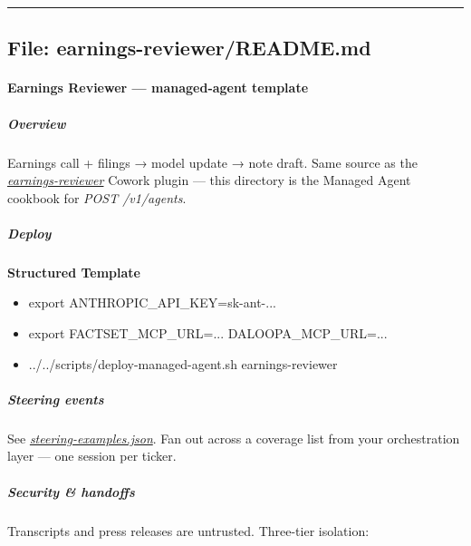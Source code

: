 \documentclass[11pt]{article}
\begin{document}
\vspace{0.8em}\hrule\vspace{0.8em}

\subsection{File: earnings-reviewer/README.md}\label{file:earnings-reviewer-README-md}

\paragraph{Earnings Reviewer — managed-agent template}\mbox{}\par

\subparagraph{Overview}\mbox{}\par

Earnings call + filings → model update → note draft. Same source as the \href{../../plugins/agent-plugins/earnings-reviewer}{\emph{earnings-reviewer}} Cowork plugin — this directory is the Managed Agent cookbook for \emph{POST /v1/agents}.


\subparagraph{Deploy}\mbox{}\par

\textbf{Structured Template}
\begin{itemize}[leftmargin=*,itemsep=2pt,topsep=2pt]
\item {} export ANTHROPIC\_\allowbreak{}API\_\allowbreak{}KEY=sk-ant-...
\item {} export FACTSET\_\allowbreak{}MCP\_\allowbreak{}URL=... DALOOPA\_\allowbreak{}MCP\_\allowbreak{}URL=...
\item {} ../../scripts/deploy-managed-agent.sh earnings-reviewer
\end{itemize}

\subparagraph{Steering events}\mbox{}\par

See \href{./steering-examples.json}{\emph{steering-examples.json}}. Fan out across a coverage list from your orchestration layer — one session per ticker.


\subparagraph{Security \& handoffs}\mbox{}\par

Transcripts and press releases are untrusted. Three-tier isolation:
\end{document}
